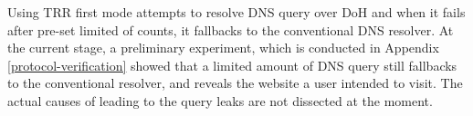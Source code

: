 Using TRR first mode attempts to resolve DNS query over DoH and when it fails after pre-set limited of counts, it fallbacks to the conventional DNS resolver.
At the current stage, a preliminary experiment, which is conducted in Appendix \ref{protocol-verification} showed that a limited amount of DNS query still fallbacks to the conventional resolver, and reveals the website a user intended to visit.
The actual causes of leading to the query leaks are not dissected at the moment.